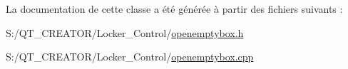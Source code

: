 La documentation de cette classe a été générée à partir des fichiers suivants \+:\begin{DoxyCompactItemize}
\item 
S\+:/\+Q\+T\+\_\+\+C\+R\+E\+A\+T\+O\+R/\+Locker\+\_\+\+Control/\hyperlink{openemptybox_8h}{openemptybox.\+h}\item 
S\+:/\+Q\+T\+\_\+\+C\+R\+E\+A\+T\+O\+R/\+Locker\+\_\+\+Control/\hyperlink{openemptybox_8cpp}{openemptybox.\+cpp}\end{DoxyCompactItemize}
